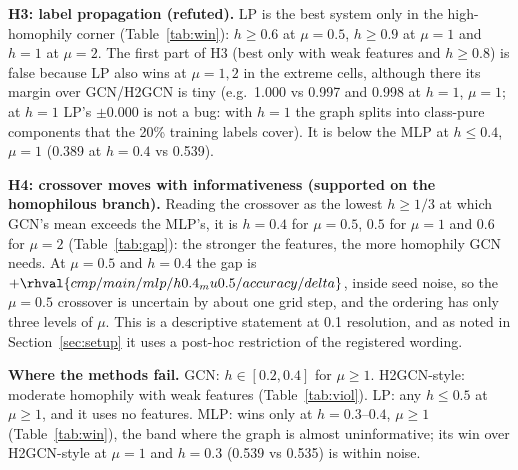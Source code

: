 \begin{table}[t]\centering\caption{Cells where H2GCN-style is more than 0.02 below the better of MLP and GCN (test accuracy, mean over 5 seeds).}\label{tab:viol}
\end{table}

\textbf{H3: label propagation (refuted).} LP is the best system only in the high-homophily corner (Table~\ref{tab:win}): $h\ge0.6$ at $\mu=0.5$, $h\ge0.9$ at $\mu=1$ and $h=1$ at $\mu=2$. The first part of H3 (best only with weak features and $h\ge0.8$) is false because LP also wins at $\mu=1,2$ in the extreme cells, although there its margin over GCN/H2GCN is tiny (e.g.\ 1.000 vs 0.997 and 0.998 at $h=1$, $\mu=1$; at $h=1$ LP's $\pm0.000$ is not a bug: with $h=1$ the graph splits into class-pure components that the 20\% training labels cover). It is below the MLP at $h\le0.4$, $\mu=1$ (0.389 at $h=0.4$ vs 0.539).

\textbf{H4: crossover moves with informativeness (supported on the homophilous branch).} Reading the crossover as the lowest $h\ge1/3$ at which GCN's mean exceeds the MLP's, it is $h=0.4$ for $\mu=0.5$, $0.5$ for $\mu=1$ and $0.6$ for $\mu=2$ (Table~\ref{tab:gap}): the stronger the features, the more homophily GCN needs. At $\mu=0.5$ and $h=0.4$ the gap is $+\rhval{cmp/main/mlp/h0.4_mu0.5/accuracy/delta}$, inside seed noise, so the $\mu=0.5$ crossover is uncertain by about one grid step, and the ordering has only three levels of $\mu$. This is a descriptive statement at 0.1 resolution, and as noted in Section~\ref{sec:setup} it uses a post-hoc restriction of the registered wording.

\textbf{Where the methods fail.} GCN: $h\in[0.2,0.4]$ for $\mu\ge1$. H2GCN-style: moderate homophily with weak features (Table~\ref{tab:viol}). LP: any $h\le0.5$ at $\mu\ge1$, and it uses no features. MLP: wins only at $h=0.3$--$0.4$, $\mu\ge1$ (Table~\ref{tab:win}), the band where the graph is almost uninformative; its win over H2GCN-style at $\mu=1$ and $h=0.3$ (0.539 vs 0.535) is within noise.
